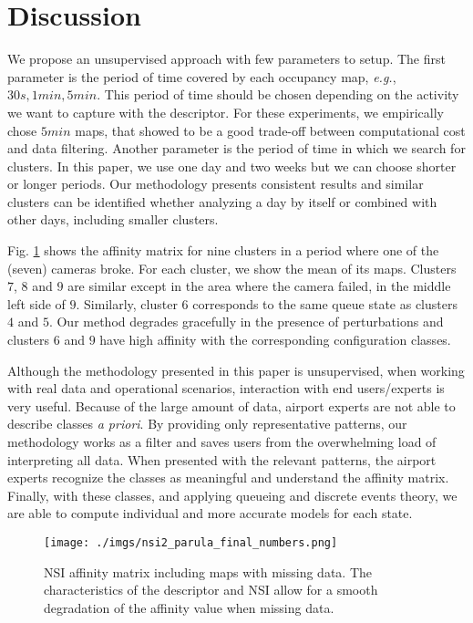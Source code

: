 \section{Discussion}
\label{sec:disc}
We propose an unsupervised approach with few parameters to setup.
The first parameter is the period of time covered by each occupancy map, \emph{e.g.}, $30s, 1min, 5min$. 
This period of time should be chosen depending on the activity we want to capture with the descriptor.
For these experiments, we empirically chose $5min$ maps, that showed to be a good trade-off between computational cost and data filtering.
Another parameter is the period of time in which we search for clusters. 
In this paper, we use one day and two weeks but we can choose shorter or longer periods.
Our methodology presents consistent results and similar clusters can be identified whether analyzing a day by itself or combined with other days, including smaller clusters. 

Fig. \ref{fig:affinity-missing} shows the affinity matrix for nine clusters in a period where one of the (seven) cameras broke. For each cluster, we show the mean of its maps.
Clusters $7$, $8$ and $9$ are similar except in the area where the camera failed, in the middle left side of $9$. Similarly, cluster $6$ corresponds to the same queue state as clusters $4$ and $5$. 
Our method degrades gracefully in the presence of perturbations and clusters $6$ and $9$ have high affinity with the corresponding configuration classes.

Although the methodology presented in this paper is unsupervised, when working with real data and operational scenarios, interaction with end users/experts is very useful.
Because of the large amount of data, airport experts are not able to describe classes \emph{a priori}.
By providing only representative patterns, our methodology works as a filter and saves users from the overwhelming load of interpreting all data.
When presented with the relevant patterns, the airport experts recognize the classes as meaningful and understand the affinity matrix.
Finally, with these classes, and applying queueing and discrete events theory, we are able to compute individual and more accurate models for each state.
\begin{figure}[bht]
\centering
\texttt{[image: ./imgs/nsi2\_parula\_final\_numbers.png]}
\caption{NSI affinity matrix including maps with missing data. The characteristics of the descriptor and NSI allow for a smooth degradation of the affinity value when missing data.}
\label{fig:affinity-missing}
\end{figure}
%


